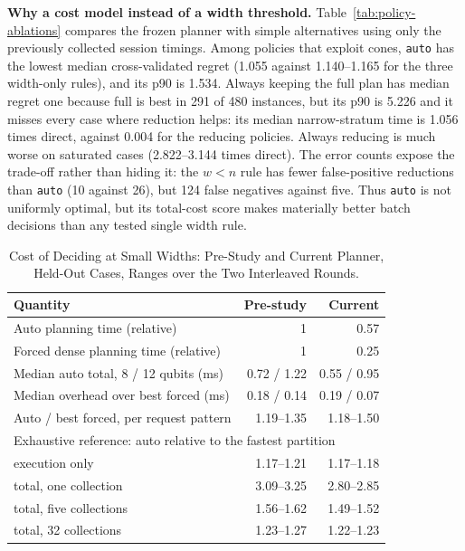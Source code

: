 \begin{table}[!t]
\caption{Decision-Policy Ablation on 480 Held-Out Instances. Median and p90 Are Cross-Validated Total-Time Regret at One Collection. Narrow and Saturated Give Median Policy Time over Direct Qulacs. FP Selects a Cone Plan When Full Is Best (291 Cases); FN Selects Full When a Cone Plan Is Best (189 Cases). Simple Structural Selectors Pay the Same Analysis Cost as \texttt{auto}.}
\label{tab:policy-ablations}
\centering
\setlength{\tabcolsep}{2.5pt}
\footnotesize
\resizebox{\columnwidth}{!}{}
\end{table}

\textbf{Why a cost model instead of a width threshold.} Table~\ref{tab:policy-ablations} compares the frozen planner with simple alternatives using only the previously collected session timings. Among policies that exploit cones, \texttt{auto} has the lowest median cross-validated regret (1.055 against 1.140--1.165 for the three width-only rules), and its p90 is 1.534. Always keeping the full plan has median regret one because full is best in 291 of 480 instances, but its p90 is 5.226 and it misses every case where reduction helps: its median narrow-stratum time is 1.056 times direct, against 0.004 for the reducing policies. Always reducing is much worse on saturated cases (2.822--3.144 times direct). The error counts expose the trade-off rather than hiding it: the $w<n$ rule has fewer false-positive reductions than \texttt{auto} (10 against 26), but 124 false negatives against five. Thus \texttt{auto} is not uniformly optimal, but its total-cost score makes materially better batch decisions than any tested single width rule.


\begin{table}[!t]
\caption{Cost of Deciding at Small Widths: Pre-Study and Current Planner, Held-Out Cases, Ranges over the Two Interleaved Rounds.}
\label{tab:rq3}
\centering
\setlength{\tabcolsep}{3pt}
\footnotesize
\begin{tabular}{lrr}
\toprule
Quantity & Pre-study & Current\\
\midrule
Auto planning time (relative) & 1 & 0.57\\
Forced dense planning time (relative) & 1 & 0.25\\
Median auto total, 8 / 12 qubits (ms) & 0.72 / 1.22 & 0.55 / 0.95\\
Median overhead over best forced (ms) & 0.18 / 0.14 & 0.19 / 0.07\\
Auto / best forced, per request pattern & 1.19--1.35 & 1.18--1.50\\
\midrule
\multicolumn{3}{l}{Exhaustive reference: auto relative to the fastest partition}\\
\quad execution only & 1.17--1.21 & 1.17--1.18\\
\quad total, one collection & 3.09--3.25 & 2.80--2.85\\
\quad total, five collections & 1.56--1.62 & 1.49--1.52\\
\quad total, 32 collections & 1.23--1.27 & 1.22--1.23\\
\bottomrule
\end{tabular}
\end{table}

